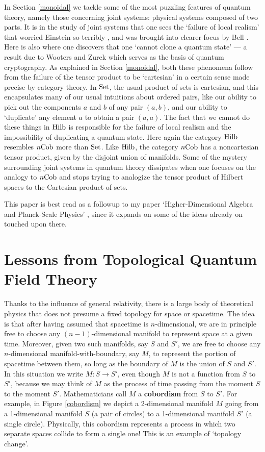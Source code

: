 \documentclass[12pt]{article}
\newcommand{\Set}{{\rm Set}}
\newcommand{\Hilb}{{\rm Hilb}}
\newcommand{\Cob}{{\rm Cob}}
\renewcommand{\to}{\rightarrow}
\newcommand{\maps}{\colon}
\begin{document}
In Section \ref{monoidal} we tackle some of the most puzzling
features of quantum theory, namely those concerning joint systems:
physical systems composed of two parts.  It is in the study of joint
systems that one sees the `failure of local realism' that worried
Einstein so terribly \cite{EPR}, and was brought into clearer focus by
Bell \cite{Bell}.  Here is also where one discovers that one `cannot
clone a quantum state' --- a result due to Wooters and Zurek \cite{WZ}
which serves as the basis of quantum cryptography.  As explained in
Section \ref{monoidal}, both these phenomena follow from the failure
of the tensor product to be `cartesian' in a certain sense made
precise by category theory.  In $\Set$, the usual product of sets 
is cartesian, and this encapsulates many of our usual intuitions
about ordered pairs, like our ability to pick out the components $a$
and $b$ of any pair $(a,b)$, and our ability to `duplicate' any
element $a$ to obtain a pair $(a,a)$.  The fact that we cannot do
these things in $\Hilb$ is responsible for the failure of local
realism and the impossibility of duplicating a quantum state.  Here
again the category $\Hilb$ resembles $n\Cob$ more than $\Set$.  Like
$\Hilb$, the category $n\Cob$ has a noncartesian tensor product, given
by the disjoint union of manifolds.  Some of the mystery surrounding
joint systems in quantum theory dissipates when one focuses on the
analogy to $n\Cob$ and stops trying to analogize the tensor product of
Hilbert spaces to the Cartesian product of sets.

This paper is best read as a followup to my paper `Higher-Dimensional
Algebra and Planck-Scale Physics' \cite{B3}, since it expands on
some of the ideas already on touched upon there.  

\section{Lessons from Topological Quantum Field Theory} \label{TQFT}

Thanks to the influence of general relativity, there is a large
body of theoretical physics that does not presume a fixed topology 
for space or spacetime.  The idea is that after having assumed that
spacetime is $n$-dimensional, we are in principle free to choose any 
$(n-1)$-dimensional manifold to represent space at a given time.  
Moreover, given two such manifolds, say $S$ and $S'$, we are free to 
choose any $n$-dimensional manifold-with-boundary, say $M$, 
to represent the portion of spacetime between them, so long as 
the boundary of $M$ is the union of $S$ and $S'$.  In this situation 
we write $M \maps S \to S'$, even though $M$ is not a function from 
$S$ to $S'$, because we may think of $M$ as the process of time passing 
from the moment $S$ to the moment $S'$.  Mathematicians call $M$ a 
{\bf cobordism} from $S$ to $S'$.  For example, in Figure 
\ref{cobordism} we depict a 2-dimensional manifold $M$ going from 
a 1-dimensional manifold $S$ (a pair of circles) to a 1-dimensional 
manifold $S'$ (a single circle).   Physically, this cobordism 
represents a process in which two separate spaces collide to form a 
single one!  This is an example of `topology change'.
\end{document}
